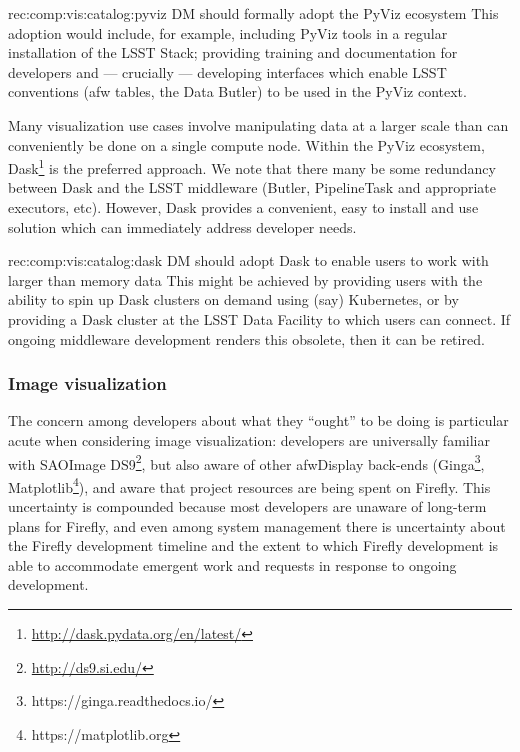 \begin{recommendation}
  {rec:comp:vis:catalog:pyviz}
  {DM should formally adopt the PyViz ecosystem}
This adoption would include, for example, including PyViz tools in a regular installation of the LSST Stack; providing training and documentation for developers and --- crucially --- developing interfaces which enable LSST conventions (afw tables, the Data Butler) to be used in the PyViz context.
\end{recommendation}

Many visualization use cases involve manipulating data at a larger scale than can conveniently be done on a single compute node.
Within the PyViz ecosystem, Dask\footnote{\url{http://dask.pydata.org/en/latest/}} is the preferred approach.
We note that there many be some redundancy between Dask and the LSST middleware (Butler, PipelineTask and appropriate executors, etc).
However, Dask provides a convenient, easy to install and use solution which can immediately address developer needs.

\begin{recommendation}
  {rec:comp:vis:catalog:dask}
  {DM should adopt Dask to enable users to work with larger than memory data}
This might be achieved by providing users with the ability to spin up Dask clusters on demand using (say) Kubernetes, or by providing a Dask cluster at the LSST Data Facility to which users can connect.
If ongoing middleware development renders this obsolete, then it can be retired.
\end{recommendation}

\subsubsection{Image visualization}
\label{sec:comp:vis:image}

The concern among developers about what they ``ought'' to be doing is particular acute when considering image visualization: developers are universally familiar with SAOImage DS9\footnote{\url{http://ds9.si.edu/}}, but also aware of other afwDisplay back-ends (Ginga\footnote{https://ginga.readthedocs.io/}, Matplotlib\footnote{https://matplotlib.org}), and aware that project resources are being spent on Firefly.
This uncertainty is compounded because most developers are unaware of long-term plans for Firefly, and even among system management there is uncertainty about the Firefly development timeline and the extent to which Firefly development is able to accommodate emergent work and requests in response to ongoing development.

